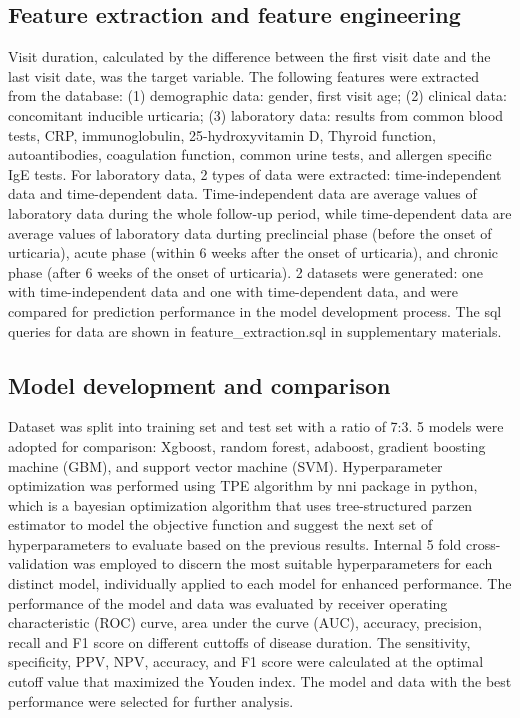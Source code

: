 \documentclass[final,1p,times,authoryear]{elsarticle}
\begin{document}
\subsection{Feature extraction and feature engineering}\label{FeatureEngineering}
Visit duration, calculated by the difference between the first visit date and the last visit date, was the target variable. The following features were extracted from the database: (1) demographic data: gender, first visit age; (2) clinical data: concomitant inducible urticaria; (3) laboratory data: results from common blood tests, CRP, immunoglobulin, 25-hydroxyvitamin D, Thyroid function, autoantibodies, coagulation function, common urine tests, and allergen specific IgE tests. 
For laboratory data, 2 types of data were extracted: time-independent data and time-dependent data. Time-independent data are average values of laboratory data during the whole follow-up period, while time-dependent data are average values of laboratory data durting preclincial phase (before the onset of urticaria), acute phase (within 6 weeks after the onset of urticaria), and chronic phase (after 6 weeks of the onset of urticaria). 2 datasets were generated: one with time-independent data and one with time-dependent data, and were compared for prediction performance in the model development process. The sql queries for data are shown in feature\_extraction.sql in supplementary materials. 

\subsection{Model development and comparison}\label{Training}
Dataset was split into training set and test set with a ratio of 7:3. 5 models were adopted for comparison: Xgboost, random forest, adaboost, gradient boosting machine (GBM), and support vector machine (SVM). Hyperparameter optimization was performed using TPE algorithm by nni package in python, which is a bayesian optimization algorithm that uses tree-structured parzen estimator to model the objective function and suggest the next set of hyperparameters to evaluate based on the previous results. Internal 5 fold cross-validation was employed to discern the most suitable hyperparameters for each distinct model, individually applied to each model for enhanced performance. The performance of the model and data was evaluated by receiver operating characteristic (ROC) curve, area under the curve (AUC), accuracy, precision, recall and F1 score on different cuttoffs of disease duration. The sensitivity, specificity, PPV, NPV, accuracy, and F1 score were calculated at the optimal cutoff value that maximized the Youden index. The model and data with the best performance were selected for further analysis.
\end{document}
